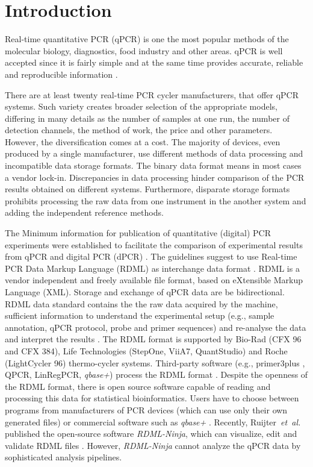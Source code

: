 \documentclass{bioinfo}
\begin{document}
	\section{Introduction}
	
	Real-time quantitative PCR (qPCR) is one the most popular methods of the 
	molecular biology, diagnostics, food industry and other areas. qPCR is well 
	accepted since it is fairly simple and at the same time provides accurate, 
	reliable and reproducible information \cite{pabinger_2014}.
	
	There are at least twenty real-time PCR cycler manufacturers, that offer 
	qPCR systems. Such variety creates broader selection of the appropriate models, 
	differing in many details as the number of samples at one run, the number of 
	detection channels, the method of work, the price and other parameters. However, 
	the diversification comes at a cost. The majority of devices, even produced by a 
	single manufacturer, use different methods of data processing and incompatible 
	data storage formats. The binary data format means in most cases a vendor 
	lock-in. Discrepancies in data processing hinder comparison of the PCR results 
	obtained on different systems. Furthermore, disparate storage formats prohibits 
	processing the raw data from one instrument in the another system and adding the 
	independent reference methods.
	
	The Minimum information for publication of quantitative (digital) PCR 
	experiments  were established to facilitate the comparison of experimental 
	results from qPCR and digital PCR (dPCR) \cite{huggett_2013}. The guidelines 
	suggest to use Real-time PCR Data Markup Language (RDML) as interchange data 
	format \cite{rdml-ninja_2015}. RDML is a vendor independent and freely available 
	file format, based on eXtensible Markup Language (XML). Storage and exchange of 
	qPCR data are be bidirectional. RDML data standard contains the the raw data 
	acquired by the machine, sufficient information to understand the experimental 
	setup (e.g., sample annotation, qPCR protocol, probe and primer sequences) and 
	re-analyse the data and interpret the results \cite{lefever_rdml_2009}. The RDML 
	format is supported by Bio-Rad (CFX 96 and CFX 384), Life Technologies (StepOne, 
	ViiA7, QuantStudio) and Roche (LightCycler 96) thermo-cycler systems. 
	Third-party software (e.g., primer3plus \cite{untergasser_2007}, QPCR, 
	LinRegPCR, \textit{qbase+}) process the RDML format \cite{pabinger_2014, 
	rdml-ninja_2015}. Despite the openness of the RDML format, there is open source 
	software capable of reading and processing this data for statistical 
	bioinformatics. Users have to choose between programs from manufacturers of PCR 
	devices (which can use only their own generated files) or commercial software 
	such as \textit{qbase+} \cite{pabinger_2014, rdml-ninja_2015}. Recently, 
	Ruijter~\textit{et~al.} published the open-source software \textit{RDML-Ninja}, 
	which can visualize, edit and validate RDML files \cite{rdml-ninja_2015}. 
	However, \textit{RDML-Ninja} cannot analyze the qPCR data by sophisticated 
	analysis pipelines. 
	
\end{document}

